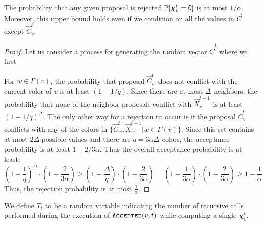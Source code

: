 \begin{lemma}
\label{lem:color_reject_probability}
The probability that any given proposal is rejected $\mathbb P[\bm\chi^t_v=\mathsf{0}]$ is at most $1/\alpha$.
Moreover, this upper bound holds even if we condition on all the values in $\vec C$ except $\vec C^t_v$.
\end{lemma}
\begin{proof}
Let us consider a process for generating the random vector $\vec C^t$ where we first

For $w\in \Gamma(v)$, the probability that proposal $\vec C^t_w$ does not conflict with the current color of $v$ is at least $(1-1/q)$.
Since there are at most $\Delta$ neighbors, the probability
that none of the neighbor proposals conflict with $\vec X^{t-1}_v$ is at least $(1-1/q)^{\Delta}$.
The only other way for a rejection to occur is if the proposal $\vec C^t_v$
conflicts with any of the colors in $\{\vec C^t_w, \vec X^{t-1}_w | w\in\Gamma(v)\}$.
Since this set contains at most $2\Delta$ possible values and there are $q=3\alpha\Delta$ colors, the acceptance probability is at least $1-2/3\alpha$.
Thus the overall acceptance probability is at least:
\[
\left(1-\frac{1}{q}\right)^{\Delta}\cdot\left( 1-\frac{2}{3\alpha}\right) \ge \left(1 - \frac{\Delta}{q}\right)\cdot\left( 1-\frac{2}{3\alpha}\right)
= \left(1 - \frac{1}{3\alpha}\right)\cdot\left( 1-\frac{2}{3\alpha}\right) \ge 1 - \frac{1}{\alpha}
\]
Thus, the rejection probability is at most $\frac{1}{\alpha}$.
\end{proof}

\begin{definition}
\label{def:coloring_recursions}
We define $T_t$ to be a random variable indicating the number of recursive calls performed during the execution of $\texttt{\textsc{Accepted}}(v,t)$
while computing a single $\bm \chi_v^t$.
\end{definition}

